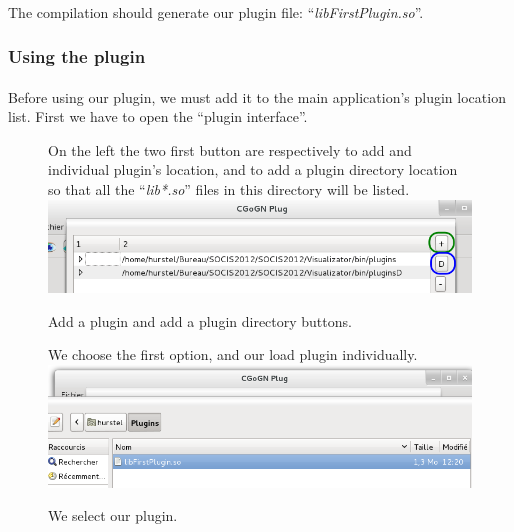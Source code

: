 \documentclass[a4paper]{scrreprt}
\begin{document}
	\paragraph{}
	The compilation should generate our plugin file:
	``\textit{libFirstPlugin.so}''.
	
	\subsubsection{Using the plugin}
	\paragraph{}
	Before using our plugin, we must add it to the main application's plugin
	location list. First we have to open the ``plugin interface''.
	\FloatBarrier
	\begin{figure}[h!p]
		On the left the two first button are respectively to add and individual
		plugin's location, and to add a plugin directory location so that all the
		``\textit{lib*.so}'' files in this directory will be listed.\\
		\centering
		\includegraphics[width=1\textwidth]{images/screenshot25}
		\caption{Add a plugin and add a plugin directory buttons.}
	\end{figure}
	\begin{figure}[h!p]
		We choose the first option, and our load plugin individually.\\
		\centering
		\includegraphics[width=1\textwidth]{images/screenshot26}
		\caption{We select our plugin.}
	\end{figure}
\end{document}
